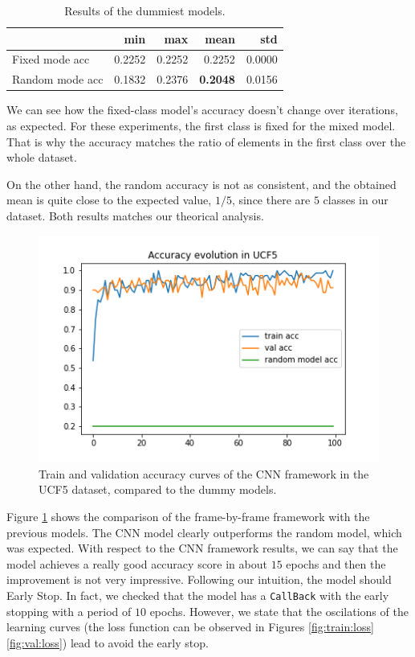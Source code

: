 \documentclass[letterpaper, 10 pt, conference]{ieeeconf}
\begin{document}
\begin{table}[H]
\centering
    \begin{tabular}{l|rrrr}
                     & min & max    & mean   & std    \\ \hline
    Fixed mode acc  & 0.2252       & 0.2252 & 0.2252 & 0.0000 \\
    Random mode acc & 0.1832     & 0.2376 & \textbf{0.2048} & 0.0156
    \end{tabular}
    \caption{Results of the dummiest models.}
    \label{tab:results1}
\end{table}

We can see how the fixed-class model's accuracy doesn't change over iterations, as expected. For these experiments, the first class is fixed for the mixed model. That is why the accuracy matches the ratio of elements in the first class over the whole dataset.

On the other hand, the random accuracy is not as consistent, and the obtained mean is quite close to the expected value, $1/5$, since there are $5$ classes in our dataset. Both results matches our theorical analysis.

\begin{figure}[H]
    \centering
    \includegraphics[scale=0.6]{Figures/inception-5-5.png}
    \caption{Train and validation accuracy curves of the CNN framework in the UCF5 dataset, compared to the dummy models.}
    \label{fig:UCF5:acc}
\end{figure}

Figure \ref{fig:UCF5:acc} shows the comparison of the frame-by-frame framework with the previous models. The CNN model clearly outperforms the random model, which was expected. With respect to the CNN framework results, we can say that the model achieves a really good accuracy score in about \(15\) epochs and then the improvement is not very impressive. Following our intuition, the model should Early Stop. In fact, we checked that the model has a \texttt{CallBack} with the early stopping with a period of \(10\) epochs. However, we state that the oscilations of the learning curves (the loss function can be observed in Figures \ref{fig:train:loss} \ref{fig:val:loss}) lead to avoid the early stop. 
\end{document}

